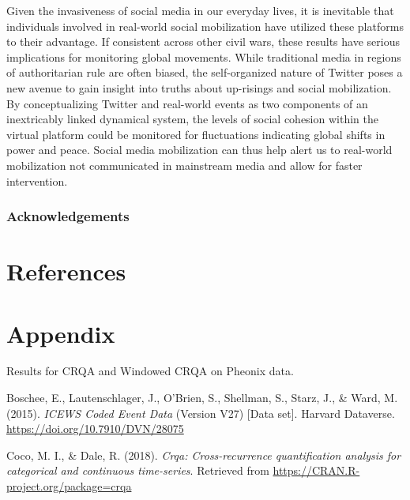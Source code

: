 \documentclass[english,man]{apa6}
\begin{document}
Given the invasiveness of social media in our everyday lives, it is inevitable that individuals involved in real-world social mobilization have utilized these platforms to their advantage. If consistent across other civil wars, these results have serious implications for monitoring global movements. While traditional media in regions of authoritarian rule are often biased, the self-organized nature of Twitter poses a new avenue to gain insight into truths about up-risings and social mobilization. By conceptualizing Twitter and real-world events as two components of an inextricably linked dynamical system, the levels of social cohesion within the virtual platform could be monitored for fluctuations indicating global shifts in power and peace. Social media mobilization can thus help alert us to real-world mobilization not communicated in mainstream media and allow for faster intervention.

\hypertarget{acknowledgements}{%
\subsubsection{Acknowledgements}\label{acknowledgements}}

\newpage

\hypertarget{references}{%
\section{References}\label{references}}

\hypertarget{appendix}{%
\section{Appendix}\label{appendix}}

Results for CRQA and Windowed CRQA on Pheonix data.

\begingroup
\setlength{\parindent}{-0.5in}
\setlength{\leftskip}{0.5in}

\hypertarget{refs}{}
\leavevmode\hypertarget{ref-DVNux2f28075_2015}{}%
Boschee, E., Lautenschlager, J., O'Brien, S., Shellman, S., Starz, J., \& Ward, M. (2015). \emph{ICEWS Coded Event Data} (Version V27) {[}Data set{]}. Harvard Dataverse. \url{https://doi.org/10.7910/DVN/28075}

\leavevmode\hypertarget{ref-R-crqa}{}%
Coco, M. I., \& Dale, R. (2018). \emph{Crqa: Cross-recurrence quantification analysis for categorical and continuous time-series}. Retrieved from \url{https://CRAN.R-project.org/package=crqa}
\end{document}

